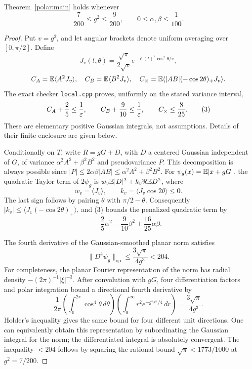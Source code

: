 \begin{lemma}\label{polar:local}
Theorem~\ref{polar:main} holds whenever
\[
 \frac7{200}\le g^2\le\frac9{200},\qquad
 0\le\alpha,\beta\le\frac1{100}.
\]
\end{lemma}
\begin{proof}
Put $v=g^2$, and let angular brackets denote uniform averaging over
$[0,\pi/2]$. Define
\[
 J_v(t,\theta)=\frac{\sqrt\pi}{2\sqrt v}
      e^{-\ell(t)^2\cos^2\theta/v},
\]
\[
 C_A=\mathbb E\langle A^2J_v\rangle,\quad
 C_B=\mathbb E\langle B^2J_v\rangle,\quad
 C_\times=\mathbb E\langle |AB|(-\cos2\theta)_+J_v\rangle.
\]
The exact checker \texttt{local.cpp} proves, uniformly on the stated
variance interval,
\[
 C_A+\frac25\le\frac1{\varepsilon},\qquad
 C_B+\frac9{10}\le\frac1{\varepsilon},\qquad C_\times\le\frac8{25}.    \tag{3}
\]
These are elementary positive Gaussian integrals, not assumptions.
Details of their finite enclosure are given below.

Conditionally on $T$, write $R=gG+D$, with $D$ a centered Gaussian
independent of $G$, of variance $\alpha^2A^2+\beta^2B^2$ and
pseudovariance $P$. This decomposition is always possible since
$|P|\le2\alpha\beta|AB|\le\alpha^2A^2+\beta^2B^2$.
For $\psi_g(x)=\mathbb E|x+gG|$, the quadratic Taylor term of $2\psi_g$
is $w_v\mathbb E|D|^2+k_v\Re\mathbb E D^2$, where
\[
 w_v=\langle J_v\rangle,\qquad k_v=\langle J_v\cos2\theta\rangle\le0.
\]
The last sign follows by pairing $\theta$ with $\pi/2-\theta$.
Consequently $|k_v|\le\langle J_v(-\cos2\theta)_+\rangle$,
and (3) bounds the penalized quadratic term by
\[
 -\frac25\alpha^2-\frac9{10}\beta^2+\frac{16}{25}\alpha\beta.   \tag{4}
\]

The fourth derivative of the Gaussian-smoothed planar norm satisfies
\[
 \|D^4\psi_g\|_{\mathrm{op}}\le\frac{3\sqrt\pi}{4g^3}<204.
\]
For completeness, the planar Fourier representation of the norm has
radial density $-(2\pi)^{-1}|\xi|^{-3}$. After convolution with $gG$,
four differentiation factors and polar integration bound a directional
fourth derivative by
\[
 \frac1{2\pi}\left(\int_0^{2\pi}\cos^4\theta\,d\theta\right)
 \left(\int_0^\infty r^2e^{-g^2r^2/4}\,dr\right)
 =\frac{3\sqrt\pi}{4g^3}.
\]
Holder's inequality gives the same bound for four different unit
directions. One can equivalently obtain this representation by
subordinating the Gaussian integral for the norm; the differentiated
integral is absolutely convergent. The inequality $<204$ follows by
squaring the rational bound $\sqrt\pi<1773/1000$ at $g^2=7/200$.


\end{proof}
